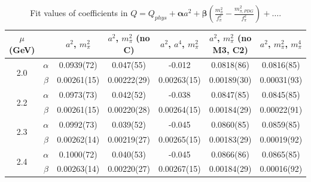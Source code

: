 \documentclass[12pt]{extarticle}
\begin{document}
\begin{table}[h!]
\begin{center}
\begin{tabular}{|c c|c|c|c|c|c|}
\hline
$\mu$ (GeV) &  & $a^2$, $m_\pi^2$& $a^2$, $m_\pi^2$ (no C)& $a^2$, $a^4$, $m_\pi^2$& $a^2$, $m_\pi^2$ (no M3, C2)& $a^2$, $m_\pi^2$, $m_\pi^4$\\
\hline
\multirow{2}{0.5in}{2.0} & $\alpha$ & 0.0939(72)& 0.047(55)& -0.012& 0.0818(86)& 0.0816(85)\\
 & $\beta$ & 0.00261(15)& 0.00222(29)& 0.00263(15)& 0.00189(30)& 0.00031(93)\\
\hline
\multirow{2}{0.5in}{2.2} & $\alpha$ & 0.0973(73)& 0.042(52)& -0.038& 0.0847(85)& 0.0845(85)\\
 & $\beta$ & 0.00261(15)& 0.00220(28)& 0.00264(15)& 0.00184(29)& 0.00022(91)\\
\hline
\multirow{2}{0.5in}{2.3} & $\alpha$ & 0.0992(73)& 0.039(52)& -0.045& 0.0860(85)& 0.0859(85)\\
 & $\beta$ & 0.00262(14)& 0.00219(27)& 0.00265(15)& 0.00183(29)& 0.00019(92)\\
\hline
\multirow{2}{0.5in}{2.4} & $\alpha$ & 0.1000(72)& 0.040(53)& -0.045& 0.0866(86)& 0.0865(85)\\
 & $\beta$ & 0.00263(14)& 0.00220(27)& 0.00267(15)& 0.00184(29)& 0.00016(92)\\
\hline
\end{tabular}
\caption{Fit values of coefficients in $Q = Q_{phys} + \mathbf{\alpha} a^2 + \mathbf{\beta}\left(\frac{m_\pi^2}{f_\pi^2}-\frac{m_{\pi,PDG}^2}{f_\pi^2}\right) + \ldots$.}
\end{center}
\end{table}




















\clearpage
\end{document}
